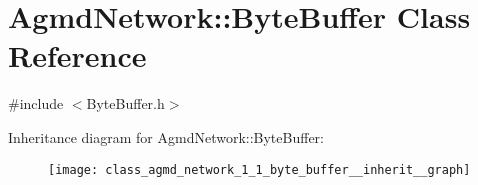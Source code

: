 \hypertarget{class_agmd_network_1_1_byte_buffer}{\section{Agmd\+Network\+:\+:Byte\+Buffer Class Reference}
\label{class_agmd_network_1_1_byte_buffer}
}


{\ttfamily \#include $<$Byte\+Buffer.\+h$>$}



Inheritance diagram for Agmd\+Network\+:\+:Byte\+Buffer\+:\nopagebreak
\begin{figure}[H]
\begin{center}
\leavevmode
\texttt{[image: class\_agmd\_network\_1\_1\_byte\_buffer\_\_inherit\_\_graph]}
\end{center}
\end{figure}
